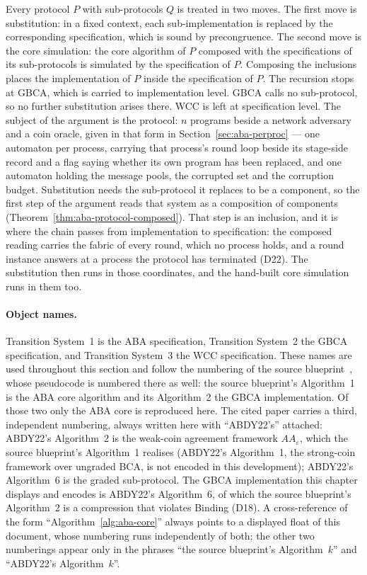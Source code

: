 Every protocol $P$ with sub-protocols $Q$ is treated in two moves.
The first move is substitution: in a fixed context, each sub-implementation is
replaced by the corresponding specification, which is sound by precongruence.
The second move is the core simulation: the core algorithm of $P$ composed with
the specifications of its sub-protocols is simulated by the specification of
$P$.
Composing the inclusions places the implementation of $P$ inside the
specification of $P$.
The recursion stops at GBCA, which is carried to implementation level.
GBCA calls no sub-protocol, so no further substitution arises there.
WCC is left at specification level.
The subject of the argument is the protocol: $n$ programs beside a
network adversary and a coin oracle, given in that form in
Section~\ref{sec:aba-perproc} --- one automaton per process, carrying that
process's round loop beside its stage-side record and a flag saying whether its
own program has been replaced, and one automaton holding the message pools, the
corrupted set and the corruption budget.
Substitution needs the sub-protocol it replaces to be a component, so the first
step of the argument reads that system as a composition of components
(Theorem~\ref{thm:aba-protocol-composed}).
That step is an inclusion, and it is where the chain passes from implementation
to specification: the composed reading carries the fabric of every round, which
no process holds, and a round instance answers at a process the protocol has
terminated (D22).
The substitution then runs in those coordinates, and the hand-built core
simulation runs in them too.

\paragraph{Object names.}
Transition System~1 is the ABA specification, Transition System~2 the GBCA
specification, and Transition System~3 the WCC specification.
These names are used throughout this section and follow the numbering of the
source blueprint~\cite{LeslieBP}, whose pseudocode is numbered there as well:
the source blueprint's Algorithm~1 is the ABA core algorithm and its
Algorithm~2 the GBCA implementation.
Of those two only the ABA core is reproduced here.
The cited paper carries a third, independent numbering, always written here
with ``ABDY22's'' attached: ABDY22's Algorithm~2 is the weak-coin agreement
framework $AA_\varepsilon$, which the source blueprint's Algorithm~1 realises
(ABDY22's Algorithm~1, the strong-coin framework over ungraded BCA, is not
encoded in this development); ABDY22's Algorithm~6 is the graded
sub-protocol.
The GBCA implementation this chapter displays and encodes is ABDY22's
Algorithm~6, of which the source blueprint's Algorithm~2 is a compression that
violates Binding (D18).
A cross-reference of the form ``Algorithm~\ref{alg:aba-core}'' always points to
a displayed float of this document, whose numbering runs independently of both;
the other two numberings appear only in the phrases ``the source blueprint's
Algorithm~$k$'' and ``ABDY22's Algorithm~$k$''.

